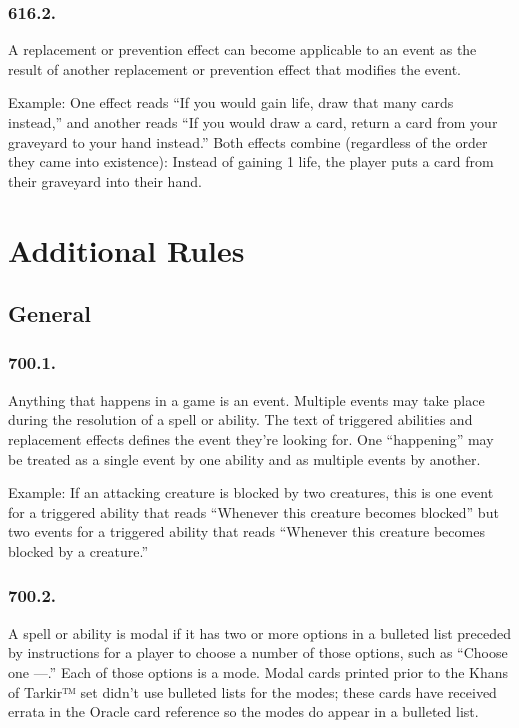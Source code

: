 \subsection*{616.2.}
A replacement or prevention effect can become applicable to an event as the result of another replacement or prevention effect that modifies the event.

Example: One effect reads “If you would gain life, draw that many cards instead,” and another reads “If you would draw a card, return a card from your graveyard to your hand instead.” Both effects combine (regardless of the order they came into existence): Instead of gaining 1 life, the player puts a card from their graveyard into their hand.

\chapter{Additional Rules}
\setcounter{section}{699}
\section{General}
\subsection*{700.1.}
Anything that happens in a game is an event. Multiple events may take place during the resolution of a spell or ability. The text of triggered abilities and replacement effects defines the event they’re looking for. One “happening” may be treated as a single event by one ability and as multiple events by another.

Example: If an attacking creature is blocked by two creatures, this is one event for a triggered ability that reads “Whenever this creature becomes blocked” but two events for a triggered ability that reads “Whenever this creature becomes blocked by a creature.”

\subsection*{700.2.}
A spell or ability is modal if it has two or more options in a bulleted list preceded by instructions for a player to choose a number of those options, such as “Choose one —.” Each of those options is a mode. Modal cards printed prior to the Khans of Tarkir™ set didn’t use bulleted lists for the modes; these cards have received errata in the Oracle card reference so the modes do appear in a bulleted list.

